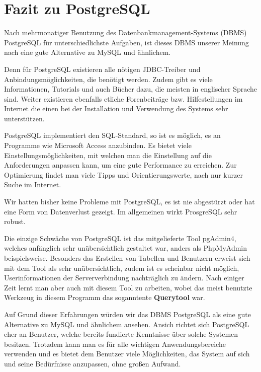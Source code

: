 \section{Fazit zu PostgreSQL}
Nach mehrmonatiger Benutzung des Datenbankmanagement-Systems (DBMS) PostgreSQL für 
unterschiedlichste Aufgaben, ist dieses DBMS unserer Meinung nach eine gute Alternative zu MySQL 
und ähnlichem. 

Denn für PostgreSQL existieren alle nötigen JDBC-Treiber und Anbindungsmöglichkeiten, die benötigt 
werden. Zudem gibt es viele Informationen, Tutorials und auch Bücher dazu, die meisten in englischer 
Sprache sind. Weiter existieren ebenfalls etliche Forenbeiträge bzw.
Hilfestellungen im Internet die einen bei der Installation und Verwendung des
Systems sehr unterstützen.

PostgreSQL implementiert den SQL-Standard, so ist es möglich, es an Programme
wie Microsoft Access anzubinden. Es bietet viele Einstellungsmöglichkeiten, mit
welchen man die Einstellung auf die Anforderungen anpassen kann, um eine gute
Performance zu erreichen. Zur Optimierung findet man viele Tipps und
Orientierungswerte, nach nur kurzer Suche im Internet.

Wir hatten bisher keine Probleme mit PostgreSQL, es ist nie abgestürzt oder hat eine Form von 
Datenverlust gezeigt. Im allgemeinen wirkt ProsgreSQL sehr robust.

Die einzige Schwäche von PostgreSQL ist das mitgelieferte Tool pgAdmin4, welches
anfänglich sehr unübersichtlich gestaltet war, anders als PhpMyAdmin beispielsweise. Besonders
das Erstellen von Tabellen und Benutzern erweist sich mit dem Tool als sehr
unübersichtlich, zudem ist es scheinbar nicht möglich, Userinformationen der
Serververbindung nachträglich zu ändern. Nach einiger Zeit lernt man aber auch
mit diesem Tool zu arbeiten, wobei das meist benutzte Werkzeug in diesem
Programm das soganntente \textbf{Querytool} war.
   
Auf Grund dieser Erfahrungen würden wir das DBMS PostgreSQL als eine gute
Alternative zu MySQL und ähnlichem ansehen. Ansich richtet sich PostgreSQL eher
an Benutzer, welche bereits fundierte Kenntnisse über solche Systemen
besitzen. Trotzdem kann man es für alle wichtigen Anwendungsbereiche
verwenden und es bietet dem Benutzer viele Möglichkeiten, das System auf sich
und seine Bedürfnisse anzupassen, ohne großen Aufwand.


\clearpage